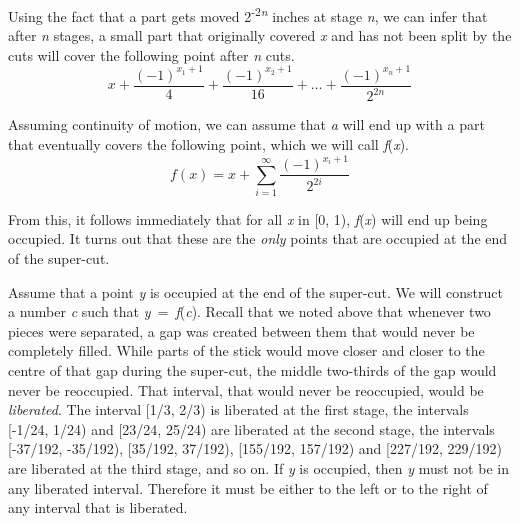 Using the fact that a part gets moved 2\textsuperscript{{}-2}\textit{\textsuperscript{n}} inches at stage \textit{n}, we can infer that after \textit{n} stages, a small part that originally covered \textit{x} and has not been split by the cuts will cover the following point after \textit{n} cuts.
\begin{equation}
x + \frac{(-1)^{x_1 + 1}}{4} + \frac{(-1)^{x_2 + 1}}{16} + \dots + \frac{(-1)^{x_n + 1}}{2^{2n}}
\end{equation}

\noindent Assuming continuity of motion, we can assume that \textit{a} will end up with a part that eventually covers the following point, which we will call \textit{f}(\textit{x}).
\begin{equation}
f(x) = x + \sum_{i=1}^{\infty}\frac{(-1)^{x_i + 1}}{2^{2i}}
\end{equation}

\noindent From this, it follows immediately that for all \textit{x} in [0, 1), \textit{f}(\textit{x}) will end up being occupied. It turns out that these are the \textit{only} points that are occupied at the end of the super-cut. 

Assume that a point \textit{y} is occupied at the end of the super-cut. We will construct a number \textit{c} such that \textit{y}~=~\textit{f}(\textit{c}). Recall that we noted above that whenever two pieces were separated, a gap was created between them that would never be completely filled. While parts of the stick would move closer and closer to the centre of that gap during the super-cut, the middle two\nobreakdash-thirds of the gap would never be reoccupied. That interval, that would never be reoccupied, would be \textit{liberated}. The interval [1/3, 2/3) is liberated at the first stage, the intervals [-1/24, 1/24) and [23/24, 25/24) are liberated at the second stage, the intervals [-37/192, -35/192), [35/192, 37/192), [155/192, 157/192) and [227/192, 229/192) are liberated at the third stage, and so on. If \textit{y} is occupied, then \textit{y} must not be in any liberated interval. Therefore it must be either to the left or to the right of any interval that is liberated. 

